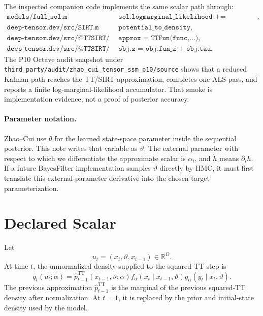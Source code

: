 \documentclass[11pt]{article}
\newcommand{\R}{\mathbb{R}}
\newcommand{\TT}{\mathrm{TT}}
\begin{document}
The inspected companion code implements the same scalar path through:
\[
\begin{array}{ll}
\texttt{models/full\_sol.m} &
  \texttt{sol.logmarginal\_likelihood += log(sirt.z)-const},\\
\texttt{deep-tensor.dev/src/SIRT.m} &
  \texttt{potential\_to\_density},\\
\texttt{deep-tensor.dev/src/@TTSIRT/TTSIRT.m} &
  \texttt{approx = TTFun(func,...)} ,\\
\texttt{deep-tensor.dev/src/@TTSIRT/marginalise.m} &
  \texttt{obj.z = obj.fun\_z + obj.tau}.
\end{array}
\]
The P10 Octave audit snapshot under
\texttt{third\_party/audit/zhao\_cui\_tensor\_ssm\_p10/source} shows that a
reduced Kalman path reaches the TT/SIRT approximation, completes one ALS pass,
and reports a finite log-marginal-likelihood accumulator.  That smoke is
implementation evidence, not a proof of posterior accuracy.

\paragraph{Parameter notation.}
Zhao--Cui use \(\theta\) for the learned state-space parameter inside the
sequential posterior.  This note writes that variable as \(\vartheta\).  The
external parameter with respect to which we differentiate the approximate
scalar is \(\alpha_i\), and \(\dot h\) means \(\partial_i h\).  If a future
BayesFilter implementation samples \(\vartheta\) directly by HMC, it must first
translate this external-parameter derivative into the chosen target
parameterization.

\section{Declared Scalar}

Let
\[
  u_t=(x_t,\vartheta,x_{t-1})\in\R^D.
\]
At time \(t\), the unnormalized density supplied to the squared-TT step is
\[
  q_t(u_t;\alpha)
  =
  \widehat p_{t-1}^{\TT}(x_{t-1},\vartheta;\alpha)
  f_\alpha(x_t\mid x_{t-1},\vartheta)
  g_\alpha(y_t\mid x_t,\vartheta).
  \label{eq:p11-qt}
\]
The previous approximation \(\widehat p_{t-1}^{\TT}\) is the marginal of the
previous squared-TT density after normalization.  At \(t=1\), it is replaced by
the prior and initial-state density used by the model.
\end{document}
